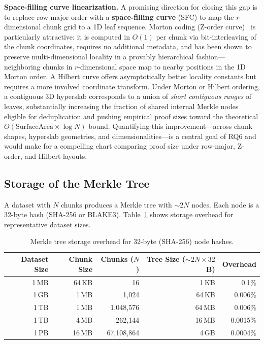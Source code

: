\documentclass[11pt]{article}
\begin{document}
\noindent\textbf{Space-filling curve linearization.}
A promising direction for closing this gap is to replace row-major order with a
\textbf{space-filling curve} (SFC) to map the $r$-dimensional chunk grid to a 1D
leaf sequence.  Morton coding (Z-order curve)~\cite{morton1966} is particularly
attractive: it is computed in $O(1)$ per chunk via bit-interleaving of the chunk
coordinates, requires no additional metadata, and has been shown to preserve
multi-dimensional locality in a provably hierarchical fashion---neighboring
chunks in $r$-dimensional space map to nearby positions in the 1D Morton order.
A Hilbert curve offers asymptotically better locality constants but requires a
more involved coordinate transform.  Under Morton or Hilbert ordering, a
contiguous 3D hyperslab corresponds to a union of \emph{short contiguous
ranges} of leaves, substantially increasing the fraction of shared internal
Merkle nodes eligible for deduplication and pushing empirical proof sizes
toward the theoretical $O(\mathrm{SurfaceArea}\times\log N)$ bound.
Quantifying this improvement---across chunk shapes, hyperslab geometries, and
dimensionalities---is a central goal of RQ6 and would make for a compelling
chart comparing proof size under row-major, Z-order, and Hilbert layouts.

\subsection{Storage of the Merkle Tree}
\label{sec:merkle-storage}

A dataset with $N$ chunks produces a Merkle tree with $\sim 2N$ nodes. Each
node is a 32-byte hash (SHA-256 or BLAKE3). Table~\ref{tab:overhead} shows
storage overhead for representative dataset sizes.

\begin{table}[H]
\centering
\caption{Merkle tree storage overhead for 32-byte (SHA-256) node hashes.}
\label{tab:overhead}
\begin{tabular}{@{}rrrrr@{}}
\toprule
Dataset Size & Chunk Size & Chunks ($N$) & Tree Size ($\sim 2N \times 32$\,B) & Overhead \\
\midrule
1\,MB   & 64\,KB  & 16       & 1\,KB     & 0.1\%   \\
1\,GB   & 1\,MB   & 1,024    & 64\,KB    & 0.006\% \\
1\,TB   & 1\,MB   & 1,048,576 & 64\,MB   & 0.006\% \\
1\,TB   & 4\,MB   & 262,144  & 16\,MB    & 0.0015\% \\
1\,PB   & 16\,MB  & 67,108,864 & 4\,GB   & 0.0004\% \\
\bottomrule
\end{tabular}
\end{table}
\end{document}
